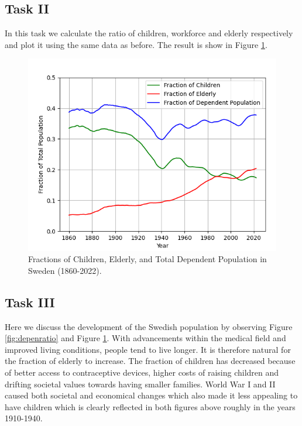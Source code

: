 \documentclass[a4paper]{article}
\begin{document}
\subsection*{Task II}
In this task we calculate the ratio of children, workforce and elderly respectively and plot it using the same data as before.
The result is show in Figure \ref{fig:frac}.



\begin{figure}[H]
  \begin{center}
    \includegraphics[scale=0.5]{frac.png}
    \caption{Fractions of Children, Elderly, and Total Dependent Population  in Sweden (1860-2022).}
    \label{fig:frac}
  \end{center}
\end{figure}

\subsection*{Task III}
Here we discuss the development of the Swedish population by observing Figure \ref{fig:depenratio} and Figure \ref{fig:frac}.
With advancements within the medical field and improved living conditions, people tend to live longer. It is therefore natural for the fraction of elderly to increase. The fraction of children has decreased because of better access to contraceptive devices, higher costs of raising children and drifting societal values towards having smaller families. World War I and II caused both societal and economical changes which also made it less appealing to have children which is clearly reflected in both figures above roughly in the years 1910-1940.\\
\end{document}
